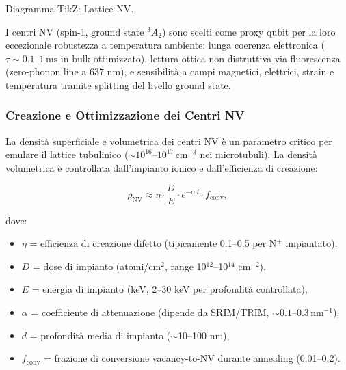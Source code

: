 \documentclass[12pt,a4paper]{article}
\begin{document}
\vspace{1cm}



Diagramma TikZ: Lattice NV. 

\vspace{1cm}


I centri NV (spin-1, ground state $^3A_2$) sono scelti come proxy qubit per la loro eccezionale robustezza a temperatura ambiente: lunga coerenza elettronica ($\tau \sim 0.1$--$1\,\mathrm{ms}$ in bulk ottimizzato), lettura ottica non distruttiva via fluorescenza (zero-phonon line a 637 nm), e sensibilità a campi magnetici, elettrici, strain e temperatura tramite splitting del livello ground state.

\subsubsection{Creazione e Ottimizzazione dei Centri NV}

La densità superficiale e volumetrica dei centri NV è un parametro critico per emulare il lattice tubulinico ($\sim 10^{16}$--$10^{17}\,\mathrm{cm}^{-3}$ nei microtubuli). La densità volumetrica è controllata dall'impianto ionico e dall'efficienza di creazione:

\begin{equation}
\rho_{\mathrm{NV}} \approx \eta \cdot \frac{D}{E} \cdot e^{-\alpha d} \cdot f_{\mathrm{conv}},
\label{eq:NV_density}
\end{equation}

dove:
\begin{itemize}
    \item $\eta$ = efficienza di creazione difetto (tipicamente 0.1--0.5 per N$^{+}$ impiantato),
    \item $D$ = dose di impianto (atomi/cm$^2$, range 10$^{12}$--10$^{14}$ cm$^{-2}$),
    \item $E$ = energia di impianto (keV, 2--30 keV per profondità controllata),
    \item $\alpha$ = coefficiente di attenuazione (dipende da SRIM/TRIM, $\sim 0.1$--$0.3\,\mathrm{nm}^{-1}$),
    \item $d$ = profondità media di impianto ($\sim$10--100 nm),
    \item $f_{\mathrm{conv}}$ = frazione di conversione vacancy-to-NV durante annealing (0.01--0.2).
\end{itemize}
\end{document}
